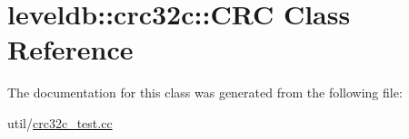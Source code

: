 \hypertarget{classleveldb_1_1crc32c_1_1_c_r_c}{\section{leveldb\-:\-:crc32c\-:\-:C\-R\-C Class Reference}
\label{classleveldb_1_1crc32c_1_1_c_r_c}
}


The documentation for this class was generated from the following file\-:\begin{DoxyCompactItemize}
\item 
util/\hyperlink{crc32c__test_8cc}{crc32c\-\_\-test.\-cc}\end{DoxyCompactItemize}
